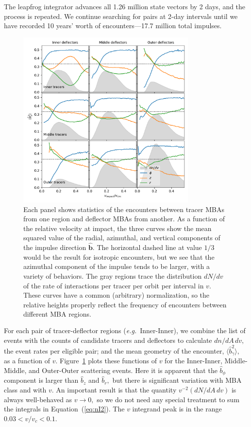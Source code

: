 \documentclass[linenumbers, onecolumn]{aastex631}
\newcommand{\eqq}[1]{Equation~(\ref{#1})}
\newcommand{\eg}{\textit{e.g.\/}}
\newcommand{\bhat}{\mathbf{\hat b}}
\begin{document}
The leapfrog integrator advances all 1.26 million state vectors by 2
days, and the process is repeated.  We continue searching for pairs at
2-day intervals until we have recorded 10 years' worth of encounters---17.7 million
total impulses.

\begin{figure}
  \centering
  \includegraphics[width=0.8\textwidth]{isq.pdf}
  \caption{Each panel shows statistics of the encounters between
    tracer MBAs from one region and deflector MBAs from another.  As a
    function of the relative velocity at impact, the three curves show
    the mean squared value of the radial, azimuthal, and vertical
    components of the impulse direction $\bhat.$  The horizontal
    dashed line at value $1/3$ would be the result for isotropic
    encounters, but we see that the azimuthal component of the impulse
    tends to be larger, with a variety of behaviors.  The gray regions
    trace the distribution $dN/dv$ of the rate of interactions per
    tracer per orbit per interval in $v.$  These curves have a common
    (arbitrary) normalization, so the relative heights properly
    reflect the frequency of encounters between different MBA
    regions.}
  \label{fig:rtz}
\end{figure}

For each pair of tracer-deflector regions (\eg\ Inner-Inner), we combine the list of
events with the counts of candidate tracers and deflectors to
calculate $dn/dA\,dv,$ the event rates per eligible pair; and the mean
geometry of the encounter, $\langle \hat b^2_\gamma \rangle,$ as a
function of $v$.  Figure~\ref{fig:rtz} plots these functions of $v$
for the Inner-Inner, Middle-Middle, and Outer-Outer scattering
events.  Here it is apparent that the $\hat b_\phi$ component is
larger than $\hat b_z$ and $\hat b_r,$ but there is significant
variation with MBA class and with $v$.  An important result is that
the quantity $v^{-2} (dN/dA\,dv)$ is always well-behaved as $v\rightarrow 0,$
so we do not need any special treatment to sum the integrals in
\eqq{eq:nI2}.  The $v$ integrand peak is in the range $0.03<v/v_c<0.1.$
\end{document}
